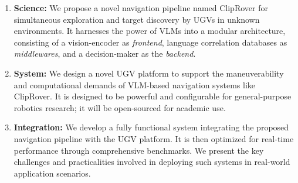 \begin{enumerate}[label={$\arabic*$.},nolistsep,leftmargin=*]
\item \textbf{Science:} We propose a novel navigation pipeline named ClipRover for simultaneous exploration and target discovery by UGVs in unknown environments. It harnesses the power of VLMs into a modular architecture, consisting of a vision-encoder as \textit{frontend}, language correlation databases as \textit{middlewares}, and a decision-maker as the \textit{backend}.

\item \textbf{System:} We design a novel UGV platform to support the maneuverability and computational demands of VLM-based navigation systems like ClipRover. It is designed to be powerful and configurable for general-purpose robotics research; it will be open-sourced for academic use. 


\item \textbf{Integration:} We develop a fully functional system integrating the proposed navigation pipeline with the UGV platform. It is then optimized for real-time performance through comprehensive benchmarks. We present the key challenges and practicalities involved in deploying such systems in real-world application scenarios. 

\end{enumerate}
